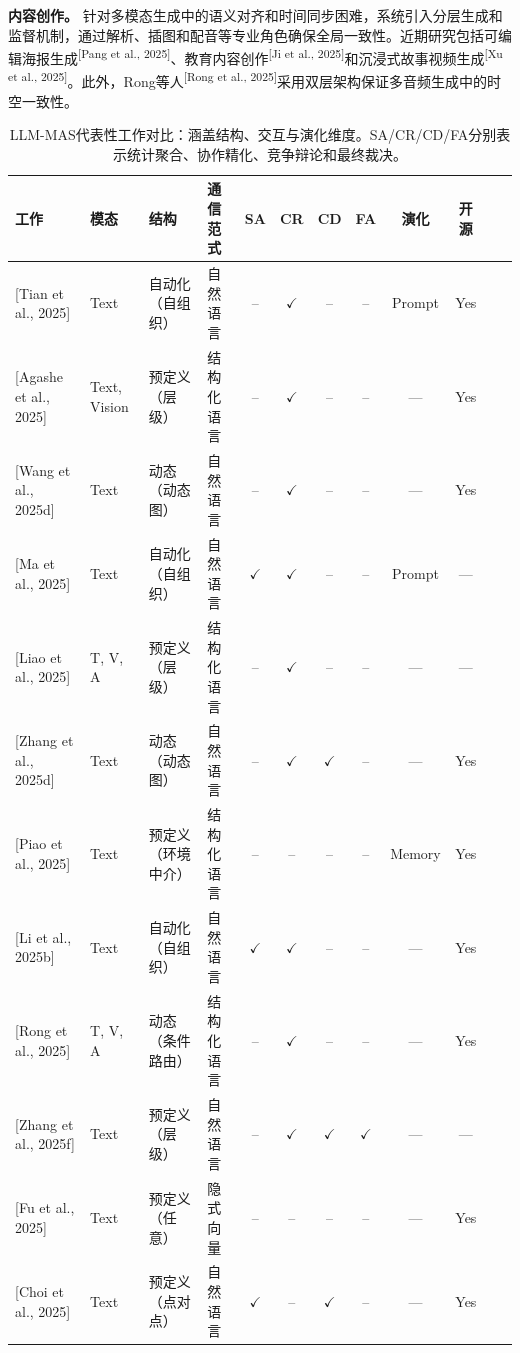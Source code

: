 \documentclass[UTF8,a4paper,12pt]{article}
\def\yes{$\checkmark$}
\def\no{--}
\begin{document}
\textbf{内容创作。} 针对多模态生成中的语义对齐和时间同步困难，系统引入分层生成和监督机制，通过解析、插图和配音等专业角色确保全局一致性。近期研究包括可编辑海报生成\textsuperscript{[Pang et al., 2025]}、教育内容创作\textsuperscript{[Ji et al., 2025]}和沉浸式故事视频生成\textsuperscript{[Xu et al., 2025]}。此外，Rong等人\textsuperscript{[Rong et al., 2025]}采用双层架构保证多音频生成中的时空一致性。

\begin{table}[htbp]
\centering
\caption{LLM-MAS代表性工作对比：涵盖结构、交互与演化维度。SA/CR/CD/FA分别表示统计聚合、协作精化、竞争辩论和最终裁决。}
\label{tab:comparison}
\tiny
\setlength{\tabcolsep}{2pt}
\begin{tabular}{p{2.4cm}p{1.5cm}p{2.2cm}p{1.8cm}ccccccp{1.2cm}c}
\toprule
\textbf{工作} & \textbf{模态} & \textbf{结构} & \textbf{通信范式} & \textbf{SA} & \textbf{CR} & \textbf{CD} & \textbf{FA} & \textbf{演化} & \textbf{开源} \\
\midrule
{[}Tian et al., 2025{]} & Text & 自动化（自组织） & 自然语言 & \no & \yes & \no & \no & Prompt & Yes \\
{[}Agashe et al., 2025{]} & Text, Vision & 预定义（层级） & 结构化语言 & \no & \yes & \no & \no & --- & Yes \\
{[}Wang et al., 2025d{]} & Text & 动态（动态图） & 自然语言 & \no & \yes & \no & \no & --- & Yes \\
{[}Ma et al., 2025{]} & Text & 自动化（自组织） & 自然语言 & \yes & \yes & \no & \no & Prompt & --- \\
{[}Liao et al., 2025{]} & T, V, A & 预定义（层级） & 结构化语言 & \no & \yes & \no & \no & --- & --- \\
{[}Zhang et al., 2025d{]} & Text & 动态（动态图） & 自然语言 & \no & \yes & \yes & \no & --- & Yes \\
{[}Piao et al., 2025{]} & Text & 预定义（环境中介） & 结构化语言 & \no & \no & \no & \no & Memory & Yes \\
{[}Li et al., 2025b{]} & Text & 自动化（自组织） & 自然语言 & \yes & \yes & \no & \no & --- & Yes \\
{[}Rong et al., 2025{]} & T, V, A & 动态（条件路由） & 结构化语言 & \no & \yes & \no & \no & --- & Yes \\
{[}Zhang et al., 2025f{]} & Text & 预定义（层级） & 自然语言 & \no & \yes & \yes & \yes & --- & --- \\
{[}Fu et al., 2025{]} & Text & 预定义（任意） & 隐式向量 & \no & \no & \no & \no & --- & Yes \\
{[}Choi et al., 2025{]} & Text & 预定义（点对点） & 自然语言 & \yes & \no & \yes & \no & --- & Yes \\

\end{tabular}
\end{table}
\end{document}
